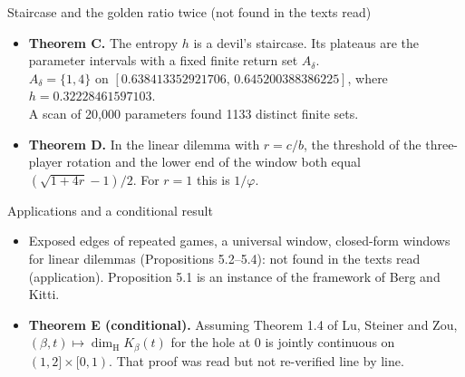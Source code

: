 \documentclass[aspectratio=169,11pt,usepdftitle=false]{beamer}
\newcommand{\dimH}{\dim_{\mathrm H}}
\begin{document}
\begin{frame}{Staircase and the golden ratio twice (not found in the texts read)}
\begin{itemize}
\item \textbf{Theorem C.} The entropy $h$ is a devil's staircase. Its plateaus are the parameter intervals with a fixed finite return set $A_\delta$.\\
$A_\delta=\{1,4\}$ on $[0.638413352921706,\,0.645200388386225]$, where $h=0.32228461597103$.\\
A scan of 20{,}000 parameters found 1133 distinct finite sets.
\item \textbf{Theorem D.} In the linear dilemma with $r=c/b$, the threshold of the three-player rotation and the lower end of the window
both equal $(\sqrt{1+4r}-1)/2$. For $r=1$ this is $1/\varphi$.
\end{itemize}
\end{frame}

\begin{frame}{Applications and a conditional result}
\begin{itemize}
\item Exposed edges of repeated games, a universal window, closed-form windows for linear dilemmas (Propositions 5.2--5.4):
not found in the texts read (application). Proposition 5.1 is an instance of the framework of Berg and Kitti.
\item \textbf{Theorem E (conditional).} Assuming Theorem 1.4 of Lu, Steiner and Zou, $(\beta,t)\mapsto\dimH K_\beta(t)$ for the hole at $0$ is jointly
continuous on $(1,2]\times[0,1)$. That proof was read but not re-verified line by line.
\end{itemize}
\end{frame}
\end{document}
